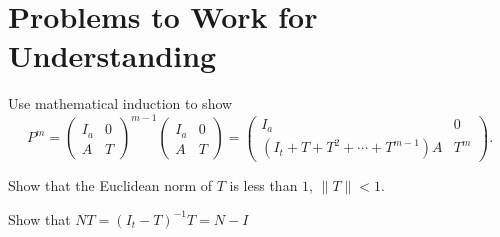 \documentclass[12pt]{article}
\begin{document}
% 

\hr

\section*{Problems to Work for Understanding}

\renewcommand{\theexerciseseries}{}
\renewcommand{\theexercise}{\arabic{exercise}}

\begin{exercise}
  Use mathematical induction to show
\[
    P^{m} =
    \begin{pmatrix}
        I_a & 0 \\
        A & T
    \end{pmatrix}
    ^{m-1}
    \begin{pmatrix}
        I_a & 0 \\
        A & T
    \end{pmatrix}
    =
    \begin{pmatrix}
        I_a & 0 \\
        (I_t + T + T^2 + \cdots + T^{m-1})A & T^m
    \end{pmatrix}.
\]
\end{exercise}

\begin{solution}
  
\end{solution}

\begin{exercise}
Show
that the
Euclidean norm of \( T \) is less than \( 1 \), \( \| T \| < 1 \).
\end{exercise}
\begin{solution}
  
\end{solution}
\begin{exercise}
   Show that \( NT =
   (I_t - T)^{-1} T = N - I \)
 \end{exercise}
 \begin{solution}
   
 \end{solution}
\begin{solution}
  
\end{solution}
\hr
\end{document}
